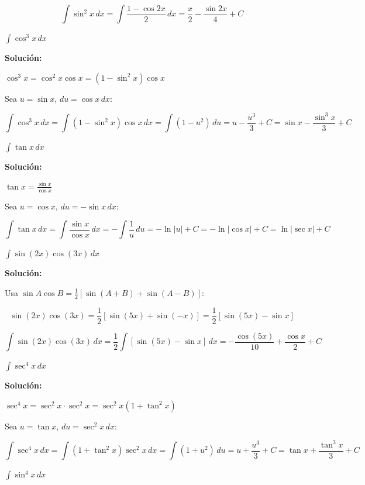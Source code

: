 \documentclass[12pt, a4paper]{book}
\begin{document}
\[
\int \sin^2 x \, dx = \int \frac{1-\cos 2x}{2} \, dx = \frac{x}{2} - \frac{\sin 2x}{4} + C
\]

\begin{ejercicio}
$\int \cos^3 x \, dx$
\end{ejercicio}

\textbf{Solución:}

$\cos^3 x = \cos^2 x \cos x = (1-\sin^2 x)\cos x$

Sea $u = \sin x$, $du = \cos x \, dx$:

\[
\int \cos^3 x \, dx = \int (1-\sin^2 x)\cos x \, dx = \int (1-u^2) \, du = u - \frac{u^3}{3} + C = \sin x - \frac{\sin^3 x}{3} + C
\]

\begin{ejercicio}
$\int \tan x \, dx$
\end{ejercicio}

\textbf{Solución:}

$\tan x = \frac{\sin x}{\cos x}$

Sea $u = \cos x$, $du = -\sin x \, dx$:

\[
\int \tan x \, dx = \int \frac{\sin x}{\cos x} \, dx = -\int \frac{1}{u} \, du = -\ln|u| + C = -\ln|\cos x| + C = \ln|\sec x| + C
\]

\begin{ejercicio}
$\int \sin(2x)\cos(3x) \, dx$
\end{ejercicio}

\textbf{Solución:}

Usa $\sin A \cos B = \frac{1}{2}[\sin(A+B) + \sin(A-B)]$:

\[
\sin(2x)\cos(3x) = \frac{1}{2}[\sin(5x) + \sin(-x)] = \frac{1}{2}[\sin(5x) - \sin x]
\]

\[
\int \sin(2x)\cos(3x) \, dx = \frac{1}{2}\int [\sin(5x) - \sin x] \, dx = -\frac{\cos(5x)}{10} + \frac{\cos x}{2} + C
\]

\begin{ejercicio}
$\int \sec^4 x \, dx$
\end{ejercicio}

\textbf{Solución:}

$\sec^4 x = \sec^2 x \cdot \sec^2 x = \sec^2 x(1 + \tan^2 x)$

Sea $u = \tan x$, $du = \sec^2 x \, dx$:

\[
\int \sec^4 x \, dx = \int (1+\tan^2 x)\sec^2 x \, dx = \int (1+u^2) \, du = u + \frac{u^3}{3} + C = \tan x + \frac{\tan^3 x}{3} + C
\]

\begin{ejercicio}
$\int \sin^4 x \, dx$
\end{ejercicio}
\end{document}
